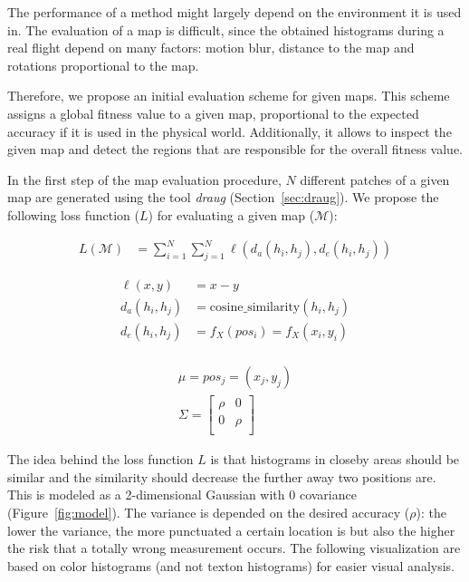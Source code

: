 The performance of a method might largely depend
on the environment it is used in. The evaluation of a map is
difficult, since the obtained histograms during a real flight depend
on many factors: motion blur, distance to the map and rotations
proportional to the map.

Therefore, we propose an initial evaluation scheme for given
maps. This scheme assigns a global fitness value to a given map,
proportional to the expected accuracy if it is used in the physical
world. Additionally, it allows to inspect the given map and detect the
regions that are responsible for the overall fitness value.

In the first step of the map evaluation procedure, $N$ different
patches of a given map are generated using the tool \emph{draug}
(Section~\ref{sec:draug}). We propose the following loss function
($L$) for evaluating a given map ($\mathcal{M}$):

\begin{align}
  L(\mathcal{M}) &= \sum_{i = 1}^{N} \sum_{j = 1}^{N} \ell(d_a(h_i, h_j), d_e(h_i, h_j))
\end{align}

\begin{align}
  \ell(x, y) &= x - y\\
  d_a(h_i, h_j) &= \text{cosine\_similarity}(h_i, h_j)\\
  d_e(h_i, h_j) &= f_X(pos_i) = f_X(x_i, y_i)\\
\end{align}

\begin{align}
\mu = pos_j = (x_j, y_j)\\
\Sigma =
  \begin{bmatrix}
    \rho & 0\\
    0 & \rho\\
  \end{bmatrix}
\end{align}

The idea behind the loss function $L$ is that histograms in closeby areas
should be similar and the similarity should decrease the further away
two positions are. This is modeled as a 2-dimensional Gaussian with 0
covariance (Figure~\ref{fig:model}). The variance is depended on the
desired accuracy ($\rho$): the lower the variance, the more punctuated
a certain location is but also the higher the risk that a totally
wrong measurement occurs. The following visualization are based on
color histograms (and not texton histograms) for easier visual
analysis.

